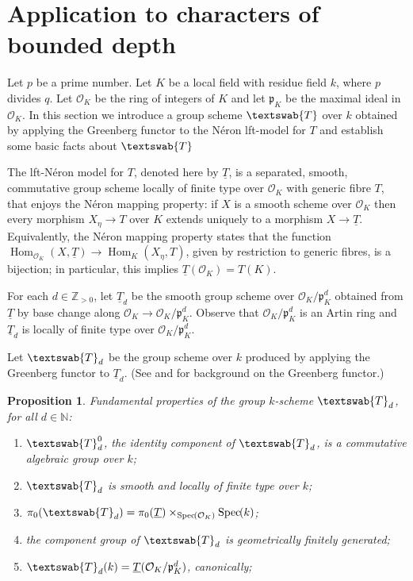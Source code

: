 \documentclass[11pt]{amsart}
\makeatletter
\theoremstyle{plain}
\newtheorem{proposition}[theorem]{Proposition}
\theoremstyle{definition}
\theoremstyle{remark}
\newcommand{\Spec}[1]{{\operatorname{Spec}\hskip-1pt( #1 )}}
\newcommand{\ZZ}{{\mathbb{Z}}}
\newcommand{\NN}{{\mathbb{N}}}
\newcommand{\OK}{\mathcal{O}_K}
\newcommand{\pK}{\mathfrak{p}_K}
\newcommand{\Fq}{k}
\DeclareMathOperator{\Hom}{Hom}
\newcommand{\GN}[1]{\textswab{#1}}
\newcommand{\TT}{\underline{T}}
\newcommand{\labitem}[2]{%
\def\@itemlabel{\textbf{#1}}
\item
\def\@currentlabel{#1}\label{#2}}
\makeatother
\begin{document}
\section{Application to characters of bounded depth}

%
Let $p$ be a prime number. Let $K$ be a local field with residue field
$\Fq$, where $p$ divides $q$. Let $\OK$ be the ring of integers of $K$
and let $\pK$ be the maximal ideal in $\OK$.
%
In this section we introduce a group scheme $\GN{T}$ over $\Fq$
obtained by applying the Greenberg functor to the N\'eron lft-model
for $T$ and establish some basic facts about $\GN{T}$


The lft-N\'eron model for $T$, denoted here by $\TT$, is a separated,
smooth, commutative group scheme locally of finite type over $\OK$
with generic fibre $T$, that enjoys the N\'eron mapping property: if
$X$ is a smooth scheme over $\OK$ then every morphism $X_\eta \to T$
over $K$ extends uniquely to a morphism $X \to \TT$. Equivalently, the
N\'eron mapping property states that the function
$\Hom_{\OK} (X,\TT) \to \Hom_K(X_\eta,T)$, given by restriction to
generic fibres, is a bijection; in particular, this implies $\TT(\OK) = T(K)$.

For each $d\in \ZZ_{>0}$, let $\TT_{d}$ be the smooth group scheme over
$\OK/\pK^d$ obtained from $\TT$ by base change along $\OK \to
\OK/\pK^d$. Observe that $\OK/\pK^d$ is an Artin ring and
$\TT_{d}$ is locally of finite type over $\OK/\pK^d$.

Let $\GN{T}_{d}$ be the group scheme over $\Fq$ produced by applying
the Greenberg functor to $\TT_{d}$. (See \cite{Greenberg:2} and
\cite[Ch. 9, \S 6]{BLR} for background on the Greenberg functor.)

\begin{proposition}\label{prop:GN}
  Fundamental properties of the group $\Fq$-scheme $\GN{T}_d$, for all $d\in \NN$:
  \begin{enumerate}
  \labitem{(GNd.0)}{GN0} $\GN{T}_d^0$, the identity component of
    $\GN{T}_d$, is a commutative algebraic group over $\Fq$;
  \labitem{(GNd.1)}{GNd} $\GN{T}_d$ is smooth and locally of finite type over $\Fq$;
  \labitem{(GNd.2)}{pi0} $\pi_0(\GN{T}_d) = \pi_0(\TT) \times_{\Spec{\OK}} \Spec{\Fq}$;
  \labitem{(GNd.3)}{fg} the component group of $\GN{T}_d$ is geometrically finitely generated;
  \labitem{(GNd.4)}{dFq} $\GN{T}_d(\Fq) = \TT(\OK/\pK^d)$, canonically;
\end{enumerate}
\end{proposition}
\end{document}
